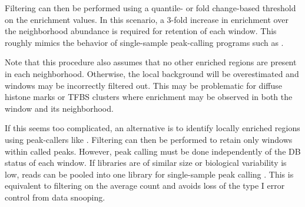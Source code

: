 \documentclass{report}\usepackage[]{graphicx}\usepackage[usenames,dvipsnames]{color}
\newcommand{\hlnum}[1]{\textcolor[rgb]{0.816,0.125,0.439}{#1}}%
\newcommand{\hlstr}[1]{\textcolor[rgb]{0.251,0.627,0.251}{#1}}%
\newcommand{\hlopt}[1]{\textcolor[rgb]{0,0,0}{#1}}%
\newcommand{\hlstd}[1]{\textcolor[rgb]{0.251,0.251,0.251}{#1}}%
\newcommand{\hlkwb}[1]{\textcolor[rgb]{0,0,0}{#1}}%
\newcommand{\hlkwc}[1]{\textcolor[rgb]{0.251,0.251,0.251}{#1}}%
\newcommand{\hlkwd}[1]{\textcolor[rgb]{0.878,0.439,0.125}{#1}}%
\newenvironment{knitrout}{}{} %
\begin{document}
\begin{knitrout}
\color{fgcolor}
\end{knitrout}

Filtering can then be performed using a quantile- or fold change-based threshold on the enrichment values. 
In this scenario, a 3-fold increase in enrichment over the neighborhood abundance is required for retention of each window.
This roughly mimics the behavior of single-sample peak-calling programs such as  \cite{zhang2008}.

\begin{knitrout}
\color{fgcolor}
\end{knitrout}

Note that this procedure also assumes that no other enriched regions are present in each neighborhood.
Otherwise, the local background will be overestimated and windows may be incorrectly filtered out. 
This may be problematic for diffuse histone marks or TFBS clusters where enrichment may be observed in both the window and its neighborhood.

If this seems too complicated, an alternative is to identify locally enriched regions using peak-callers like .
Filtering can then be performed to retain only windows within called peaks.  
However, peak calling must be done independently of the DB status of each window. 
If libraries are of similar size or biological variability is low, reads can be pooled into one library for single-sample peak calling \cite{lun2014}. 
This is equivalent to filtering on the average count and avoids loss of the type I error control from data snooping.
\end{document}
